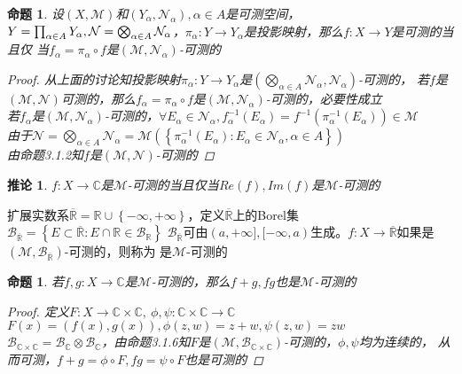 \documentclass[12pt, a4paper, oneside]{ctexbook}
\newtheorem{corollary}[theorem]{推论}
\newtheorem{proposition}[theorem]{命题}
\begin{document}
\begin{proposition}
    设$(X,\mathcal{M})$和$(Y_{\alpha},\mathcal{N}_{\alpha}),\alpha\in A$是可测空间，$Y=\prod_{\alpha\in A}Y_{\alpha},\\
    \mathcal{N}=\bigotimes_{\alpha\in A}\mathcal{N}_{\alpha}$，$\pi_{\alpha}:Y\to Y_{\alpha}$是投影映射，那么$f:X\to Y$是可测的当且仅
    当$f_{\alpha}=\pi_{\alpha}\circ f$是$(\mathcal{M},\mathcal{N}_{\alpha})$-可测的
    \begin{proof}
        从上面的讨论知投影映射$\pi_{\alpha}:Y\to Y_{\alpha}$是$(\bigotimes_{\alpha\in A}\mathcal{N}_{\alpha},\mathcal{N}_{\alpha})$-可测的，
        若$f$是$(\mathcal{M},\mathcal{N})$可测的，那么$f_{\alpha}=\pi_{\alpha}\circ f$是$(\mathcal{M},\mathcal{N}_{\alpha})$-可测的，必要性成立\\
        若$f_{\alpha}$是$(\mathcal{M},\mathcal{N}_{\alpha})$-可测的，$\forall E_{\alpha}\in\mathcal{N}_{\alpha},f^{-1}_{\alpha}(E_{\alpha})=f^{-1}(\pi_{\alpha}^{-1}(E_{\alpha}))\in\mathcal{M}$\\
        由于$\mathcal{N}=\bigotimes_{\alpha\in A}\mathcal{N}_{\alpha}=\mathcal{M}(\left\{\pi_{\alpha}^{-1}(E_{\alpha}):E_{\alpha}\in\mathcal{N}_{\alpha},\alpha\in A\right\})$\\
        由命题3.1.2知$f$是$(\mathcal{M},\mathcal{N})$-可测的
    \end{proof}
\end{proposition}
\begin{corollary}
    $f:X\to\mathbb{C}$是$\mathcal{M}$-可测的当且仅当$Re(f),Im(f)$是$\mathcal{M}$-可测的
\end{corollary}
扩展实数系$\overline{\mathbb{R}}=\mathbb{R}\cup\left\{-\infty,+\infty\right\}$，定义$\overline{\mathbb{R}}$上的Borel集$\mathcal{B}_{\overline{\mathbb{R}}}=\left\{E\subset\overline{\mathbb{R}}:E\cap\mathbb{R}\in\mathcal{B}_{\mathbb{R}}\right\}$
$\mathcal{B}_{\overline{\mathbb{R}}}$可由$(a,+\infty],[-\infty,a)$生成。$f:X\to\overline{\mathbb{R}}$如果是$(\mathcal{M},\mathcal{B}_{\overline{\mathbb{R}}})$-可测的，则称为
是$\mathcal{M}$-可测的
\begin{proposition}
    若$f,g:X\to\mathbb{C}$是$\mathcal{M}$-可测的，那么$f+g,fg$也是$\mathcal{M}$-可测的
    \begin{proof}
        定义$F:X\to \mathbb{C}\times\mathbb{C},\ \phi,\psi:\mathbb{C}\times\mathbb{C}\to \mathbb{C}$\\
        $F(x)=(f(x),g(x)),\phi(z,w)=z+w,\psi(z,w)=zw$\\
        $\mathcal{B}_{\mathbb{C}\times\mathbb{C}}=\mathcal{B}_{\mathbb{C}}\otimes\mathcal{B}_{\mathbb{C}}$，由命题3.1.6知$F$是$(\mathcal{M},\mathcal{B}_{\mathbb{C}\times\mathbb{C}})$-可测的，$\phi,\psi$均为连续的，
        从而可测，$f+g=\phi\circ F,fg=\psi\circ F$也是可测的
    \end{proof}
\end{proposition}
\end{document}
